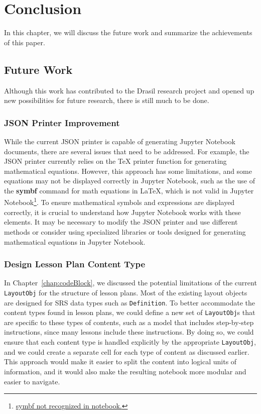 \chapter{Conclusion} \label{chap:conclusion}
In this chapter, we will discuss the future work and summarize the achievements 
of this paper.

\section{Future Work}
Although this work has contributed to the Drasil research project and opened up 
new possibilities for future research, there is still much to be done.

\subsection{JSON Printer Improvement} \label{chap:jsonPrinterImprove}
While the current JSON printer is capable of generating Jupyter Notebook 
documents, there are several issues that need to be addressed. For example, the 
JSON printer currently relies on the TeX printer function for generating 
mathematical equations. However, this approach has some limitations, and some 
equations may not be displayed correctly in Jupyter Notebook, such as the use 
of the \textbf{symbf} command for math equations in LaTeX, which is not 
valid in Jupyter 
Notebook\footnote{\href{https://github.com/JacquesCarette/Drasil/issues/2761}{symbf
 not recognized in notebook.}}. To ensure mathematical symbols and expressions 
are 
displayed correctly, it is crucial to understand how Jupyter Notebook works 
with these elements. It may be necessary to modify the JSON printer and use 
different methods or consider using specialized libraries or tools designed for 
generating mathematical equations in Jupyter Notebook. 

\subsection{Design Lesson Plan Content Type} \label{chap:designContentType}
In Chapter~\ref{chap:codeBlock}, we discussed the potential limitations of the 
current \texttt{LayoutObj} for the structure of lesson plans. Most of the 
existing layout objects are designed for SRS data types such as 
\texttt{Definition}. To better accommodate the content types found in lesson 
plans, we could define a new set of \texttt{LayoutObj}s that are specific to 
these types of contents, such as a model that includes step-by-step 
instructions, since many lessons include these instructions. By doing so, we 
could ensure that each content type is handled explicitly by the appropriate 
\texttt{LayoutObj}, and we could create a separate cell for each type of 
content as discussed earlier. This approach would make it easier to split the 
content into logical units of information, and it would also make the resulting 
notebook more modular and easier to navigate.

